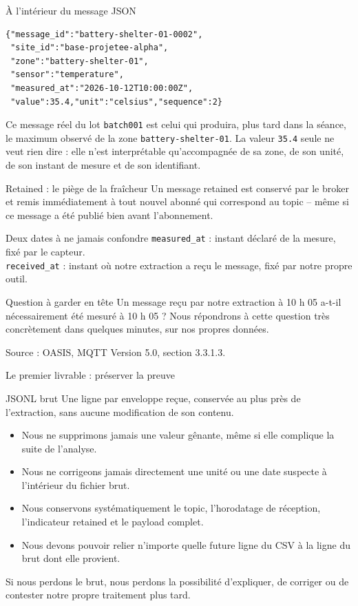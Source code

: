 \documentclass[aspectratio=169]{beamer}
\begin{document}
\begin{frame}[fragile]{À l'intérieur du message JSON}
  \scriptsize
  \begin{verbatim}
{"message_id":"battery-shelter-01-0002",
 "site_id":"base-projetee-alpha",
 "zone":"battery-shelter-01",
 "sensor":"temperature",
 "measured_at":"2026-10-12T10:00:00Z",
 "value":35.4,"unit":"celsius","sequence":2}
  \end{verbatim}
  \normalsize
  Ce message réel du lot \texttt{batch001} est celui qui produira, plus tard dans la séance, le maximum observé de la zone \texttt{battery-shelter-01}. La valeur \texttt{35.4} seule ne veut rien dire : elle n'est interprétable qu'accompagnée de sa zone, de son unité, de son instant de mesure et de son identifiant.
\end{frame}

\begin{frame}{Retained : le piège de la fraîcheur}
  Un message retained est conservé par le broker et remis immédiatement à tout nouvel abonné qui correspond au topic -- même si ce message a été publié bien avant l'abonnement.
  \begin{alertblock}{Deux dates à ne jamais confondre}
    \texttt{measured\_at} : instant déclaré de la mesure, fixé par le capteur.\\
    \texttt{received\_at} : instant où notre extraction a reçu le message, fixé par notre propre outil.
  \end{alertblock}
  \begin{block}{Question à garder en tête}
    Un message reçu par notre extraction à 10 h 05 a-t-il nécessairement été mesuré à 10 h 05 ? Nous répondrons à cette question très concrètement dans quelques minutes, sur nos propres données.
  \end{block}
  Source : OASIS, MQTT Version 5.0, section 3.3.1.3.
\end{frame}

\begin{frame}{Le premier livrable : préserver la preuve}
  \begin{block}{JSONL brut}
    Une ligne par enveloppe reçue, conservée au plus près de l'extraction, sans aucune modification de son contenu.
  \end{block}
  \begin{itemize}
    \item Nous ne supprimons jamais une valeur gênante, même si elle complique la suite de l'analyse.
    \item Nous ne corrigeons jamais directement une unité ou une date suspecte à l'intérieur du fichier brut.
    \item Nous conservons systématiquement le topic, l'horodatage de réception, l'indicateur retained et le payload complet.
    \item Nous devons pouvoir relier n'importe quelle future ligne du CSV à la ligne du brut dont elle provient.
  \end{itemize}
  \alert{Si nous perdons le brut, nous perdons la possibilité d'expliquer, de corriger ou de contester notre propre traitement plus tard.}
\end{frame}
\end{document}
